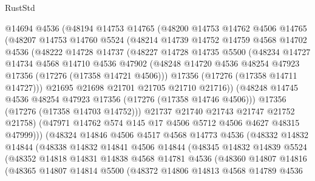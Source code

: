\begin{lexlean}{RustStd}
\begin{coremodule}
          @14694
          @4536
          (@48194
            @14753
            @14765
            (@48200
              @14753
              @14762
              @4506
              @14765
              (@48207
                @14753
                @14760
                @5524
                (@48214
                  @14739
                  @14752
                  @14759
                  @4568
                  @14702
                  @4536
                  (@48222
                    @14728
                    @14737
                    (@48227
                      @14728
                      @14735
                      @5500
                      (@48234
                        @14727
                        @14734
                        @4568
                        @14710
                        @4536
                        @47902
                        (@48248 @14720 @4536 @48254 @47923 @17356 (@17276 (@17358 @14721 @4506)))
                        @17356
                        (@17276 (@17358 @14711 @14727)))
                      @21695
                      @21698
                      @21701
                      @21705
                      @21710
                      @21716))
                  (@48248 @14745 @4536 @48254 @47923 @17356 (@17276 (@17358 @14746 @4506)))
                  @17356
                  (@17276 (@17358 @14703 @14752)))
                @21737
                @21740
                @21743
                @21747
                @21752
                @21758)
              (@47971 @14762 @574 @145 @17 @4506 @5712 @4506 @4627 @48315 @47999)))
          (@48324
            @14846
            @4506
            @4517
            @4568
            @14773
            @4536
            (@48332
              @14832
              @14844
              (@48338
                @14832
                @14841
                @4506
                @14844
                (@48345
                  @14832
                  @14839
                  @5524
                  (@48352
                    @14818
                    @14831
                    @14838
                    @4568
                    @14781
                    @4536
                    (@48360
                      @14807
                      @14816
                      (@48365
                        @14807
                        @14814
                        @5500
                        (@48372
                          @14806
                          @14813
                          @4568
                          @14789
                          @4536

\end{coremodule}
\end{lexlean}
